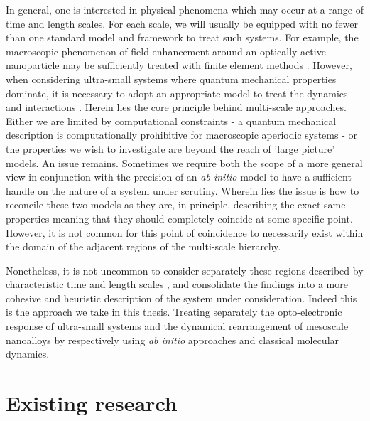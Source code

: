 In general, one is interested in physical phenomena which may occur at a range of time and length scales. For each scale, we will usually be equipped with no fewer than one standard model and framework to treat such systems. For example, the macroscopic phenomenon of field enhancement around an optically active nanoparticle may be sufficiently treated with finite element methods \cite{Girard_2005}. However, when considering ultra-small systems where quantum mechanical properties dominate, it is necessary to adopt an appropriate model to treat the dynamics and interactions \cite{Strongfieldlightdressedsolids}. Herein lies the core principle behind multi-scale approaches. Either we are limited by computational constraints - a quantum mechanical description is computationally prohibitive for macroscopic aperiodic systems - or the properties we wish to investigate are beyond the reach of 'large picture' models. An issue remains. Sometimes we require both the scope of a more general view in conjunction with the precision of an \textit{ab initio} model to have a sufficient handle on the nature of a system under scrutiny. Wherein lies the issue is how to reconcile these two models as they are, in principle, describing the exact same properties meaning that they should completely coincide at some specific point. However, it is not common for this point of coincidence to necessarily exist within the domain of the adjacent regions of the multi-scale hierarchy. 

Nonetheless, it is not uncommon to consider separately these regions described by characteristic time and length scales \cite{C5CP01096A,Coal,MATOUS2017192}, and consolidate the findings into a more cohesive and heuristic description of the system under consideration. Indeed this is the approach we take in this thesis. Treating separately the opto-electronic response of ultra-small systems and the dynamical rearrangement of mesoscale nanoalloys by respectively using \textit{ab initio} approaches and classical molecular dynamics.

\section{Existing research}
\label{sec:Res}

